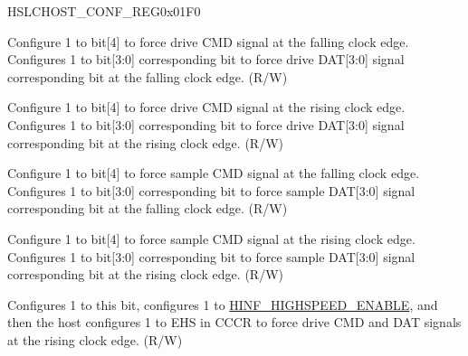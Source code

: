 \begin{register}{H}{SLCHOST\_CONF\_REG}{0x01F0}\label{regdesc:SLCHOSTCONFREG}
%
%
%
%
%
%
%
\regnewline%
\begin{regdesc}\begin{reglist}
\label{fielddesc:SLCHOSTFRCSDIO11}\item [SLCHOST\_FRC\_SDIO11] Configure 1 to bit[4] to force drive CMD signal at the falling clock edge. Configures 1 to bit[3:0] corresponding bit to force drive DAT[3:0] signal corresponding bit at the falling clock edge. (R/W)
\label{fielddesc:SLCHOSTFRCSDIO20}\item [SLCHOST\_FRC\_SDIO20] Configure 1 to bit[4] to force drive CMD signal at the rising clock edge. Configures 1 to bit[3:0] corresponding bit to force drive DAT[3:0] signal corresponding bit at the rising clock edge. (R/W)
\label{fielddesc:SLCHOSTFRCNEGSAMP}\item [SLCHOST\_FRC\_NEG\_SAMP] Configure 1 to bit[4] to force sample CMD signal at the falling clock edge. Configures 1 to bit[3:0] corresponding bit to force sample DAT[3:0] signal corresponding bit at the falling clock edge. (R/W)
\label{fielddesc:SLCHOSTFRCPOSSAMP}\item [SLCHOST\_FRC\_POS\_SAMP] Configure 1 to bit[4] to force sample CMD signal at the rising clock edge. Configures 1 to bit[3:0] corresponding bit to force sample DAT[3:0] signal corresponding bit at the rising clock edge. (R/W)
\label{fielddesc:SLCHOSTHSPEEDCONEN}\item [SLCHOST\_HSPEED\_CON\_EN] Configures 1 to this bit, configures 1 to \hyperref[fielddesc:HINFHIGHSPEEDENABLE]{HINF\_HIGHSPEED\_ENABLE}, and then the host configures 1 to EHS in CCCR to force drive CMD and DAT signals at the rising clock edge.  (R/W)
\end{reglist}\end{regdesc}
\end{register}


